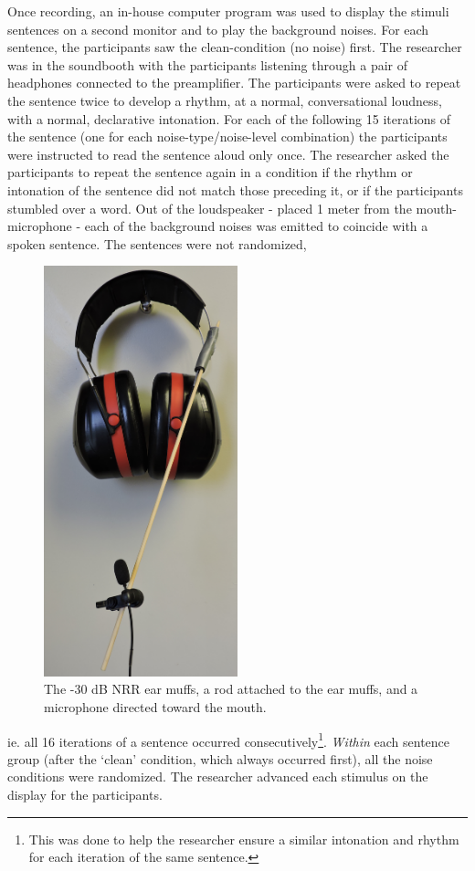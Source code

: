 Once recording, an in-house computer program was used to display the stimuli sentences on a second monitor and to play the background noises.  For each sentence, the participants saw the clean-condition (no noise) first.  The researcher was in the soundbooth with the participants listening through a pair of headphones connected to the preamplifier.  
The participants were asked to repeat the sentence twice to develop a rhythm, at a normal, conversational loudness, with a normal, declarative intonation.  For each of the following 15 iterations of the sentence (one for each noise-type/noise-level combination) the participants were instructed to read the sentence aloud only once.   The researcher asked the participants to repeat the sentence again in a condition if the rhythm or intonation of the sentence did not match those preceding it, or if the participants stumbled over a word.  Out of the loudspeaker - placed 1 meter from the mouth-microphone - each of the background noises was emitted to coincide with a spoken sentence.  The sentences were not randomized, 
%
\begin{figure}
\includegraphics[width=0.5\textwidth]{figure/earmuffSetup.JPG}
\caption{The -30 dB NRR ear muffs, a rod attached to the ear muffs, and a microphone directed toward the mouth.}
\label{fig:earmuffSetup}
\end{figure}
%
ie. all 16 iterations of a sentence occurred consecutively\footnote{This was done to help the researcher ensure a similar intonation and rhythm for each iteration of the same sentence.}. \textit{Within} each sentence group (after the `clean' condition, which always occurred first), all the noise conditions were randomized. The researcher advanced each stimulus on the display for the participants.

